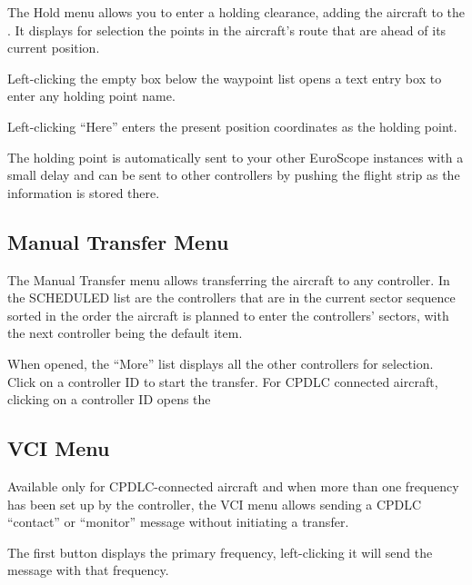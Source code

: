 \documentclass[a4paper,oneside,11pt]{memoir}
\begin{document}

The Hold menu allows you to enter a holding clearance, adding the aircraft to the . It displays for selection the points in the aircraft’s route that are ahead of its current position.

\bigskip

Left-clicking the empty box below the waypoint list opens a text entry box to enter any holding point name.

\bigskip

Left-clicking “Here” enters the present position coordinates as the holding point.

\bigskip

The holding point is automatically sent to your other EuroScope instances with a small delay and can be sent to other controllers by pushing the flight strip as the information is stored there.

\subsection{Manual Transfer Menu}
\label{menu:mxfr}


The Manual Transfer menu allows transferring the aircraft to any controller. In the SCHEDULED list are the controllers that are in the current sector sequence sorted in the order the aircraft is planned to enter the controllers’ sectors, with the next controller being the default item.

\bigskip

When opened, the “More” list displays all the other controllers for selection. Click on a controller ID to start the transfer. For CPDLC connected aircraft, clicking on a controller ID opens the 

\subsection{VCI Menu}
\label{menu:vci}


Available only for CPDLC-connected aircraft and when more than one frequency has been set up by the controller, the VCI menu allows sending a CPDLC “contact” or “monitor” message without initiating a transfer.

\bigskip

The first button displays the primary frequency, left-clicking it will send the message with that frequency.
\end{document}

